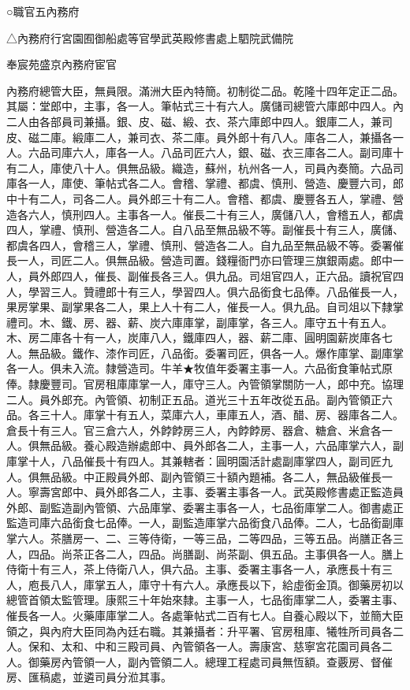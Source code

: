 
\begin{pinyinscope}
○職官五內務府

△內務府行宮園囿御船處等官學武英殿修書處上駟院武備院

奉宸苑盛京內務府宦官

內務府總管大臣，無員限。滿洲大臣內特簡。初制從二品。乾隆十四年定正二品。其屬：堂郎中，主事，各一人。筆帖式三十有六人。廣儲司總管六庫郎中四人。內二人由各部員司兼攝。銀、皮、磁、緞、衣、茶六庫郎中四人。銀庫二人，兼司皮、磁二庫。緞庫二人，兼司衣、茶二庫。員外郎十有八人。庫各二人，兼攝各一人。六品司庫六人，庫各一人。八品司匠六人，銀、磁、衣三庫各二人。副司庫十有二人，庫使八十人。俱無品級。織造，蘇州，杭州各一人，司員內奏簡。六品司庫各一人，庫使、筆帖式各二人。會稽、掌禮、都虞、慎刑、營造、慶豐六司，郎中十有二人，司各二人。員外郎三十有二人。會稽、都虞、慶豐各五人，掌禮、營造各六人，慎刑四人。主事各一人。催長二十有三人，廣儲八人，會稽五人，都虞四人，掌禮、慎刑、營造各二人。自八品至無品級不等。副催長十有三人，廣儲、都虞各四人，會稽三人，掌禮、慎刑、營造各二人。自九品至無品級不等。委署催長一人，司匠二人。俱無品級。營造司置。錢糧衙門亦曰管理三旗銀兩處。郎中一人，員外郎四人，催長、副催長各三人。俱九品。司俎官四人，正六品。讀祝官四人，學習三人。贊禮郎十有三人，學習四人。俱六品銜食七品俸。八品催長一人，果房掌果、副掌果各二人，果上人十有二人，催長一人。俱九品。自司俎以下隸掌禮司。木、鐵、房、器、薪、炭六庫庫掌，副庫掌，各三人。庫守五十有五人。木、房二庫各十有一人，炭庫八人，鐵庫四人，器、薪二庫、圓明園薪炭庫各七人。無品級。鐵作、漆作司匠，八品銜。委署司匠，俱各一人。爆作庫掌、副庫掌各一人。俱未入流。隸營造司。牛羊★牧值年委署主事一人。六品銜食筆帖式原俸。隸慶豐司。官房租庫庫掌一人，庫守三人。內管領掌關防一人，郎中充。協理二人。員外郎充。內管領、初制正五品。道光三十五年改從五品。副內管領正六品。各三十人。庫掌十有五人，菜庫六人，車庫五人，酒、醋、房、器庫各二人。倉長十有三人。官三倉六人，外餑餑房三人，內餑餑房、器倉、糖倉、米倉各一人。俱無品級。養心殿造辦處郎中、員外郎各二人，主事一人，六品庫掌六人，副庫掌十人，八品催長十有四人。其兼轄者：圓明園活計處副庫掌四人，副司匠九人。俱無品級。中正殿員外郎、副內管領三十額內題補。各二人，無品級催長一人。寧壽宮郎中、員外郎各二人，主事、委署主事各一人。武英殿修書處正監造員外郎、副監造副內管領、六品庫掌、委署主事各一人，七品銜庫掌二人。御書處正監造司庫六品銜食七品俸。一人，副監造庫掌六品銜食八品俸。二人，七品銜副庫掌六人。茶膳房一、二、三等侍衛，一等三品，二等四品，三等五品。尚膳正各三人，四品。尚茶正各二人，四品。尚膳副、尚茶副、俱五品。主事俱各一人。膳上侍衛十有三人，茶上侍衛八人，俱六品。主事、委署主事各一人，承應長十有三人，庖長八人，庫掌五人，庫守十有六人。承應長以下，給虛銜金頂。御藥房初以總管首領太監管理。康熙三十年始來隸。主事一人，七品銜庫掌二人，委署主事、催長各一人。火藥庫庫掌二人。各處筆帖式二百有七人。自養心殿以下，並簡大臣領之，與內府大臣同為內廷右職。其兼攝者：升平署、官房租庫、犧牲所司員各二人。保和、太和、中和三殿司員、內管領各一人。壽康宮、慈寧宮花園司員各二人。御藥房內管領一人，副內管領二人。總理工程處司員無恆額。查覈房、督催房、匯稿處，並遴司員分涖其事。


\end{pinyinscope}

